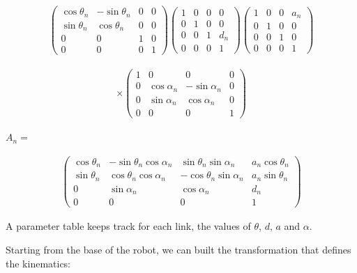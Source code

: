 \[\begin{aligned}
\begin{pmatrix}\cos \theta_{n} & -\sin \theta_{n} & 0 & 0 \\
         \sin \theta_{n} & \cos \theta_{n} & 0 & 0\\ 0 &0 & 1 & 0 \\
         0& 0& 0& 1 \end{pmatrix}
         \begin{pmatrix}1 & 0 & 0 & 0 \\ 0 & 1 & 0 & 0  \\
         0& 0 & 1 & d_{n} \\
         0& 0& 0& 1 \end{pmatrix}
         \begin{pmatrix}1 & 0 & 0 & a_{n} \\ 0 & 1 & 0 & 0  \\
         0& 0 & 1 & 0 \\
         0& 0& 0& 1 \end{pmatrix}
\end{aligned}\]

\[\begin{aligned}
\times
 \begin{pmatrix}1 & 0 & 0 & 0 \\ 0 & \cos \alpha_{n} & -\sin \alpha_{n} & 0  \\
         0& \sin \alpha_{n} & \cos \alpha_{n} & 0 \\
         0& 0& 0& 1 \end{pmatrix}
\end{aligned}\]

\(A_{n} =\)

\[\begin{aligned}
\begin{pmatrix}\cos \theta_{n} & -\sin \theta_{n}\cos \alpha_{n} & \sin \theta_{n}\sin \alpha_{n} & a_{n}\cos \theta_{n} \\
\sin \theta_{n} & \cos \theta_{n}\cos \alpha_{n} & -\cos \theta_{n}\sin \alpha_{n}  & a_{n}\sin \theta_{n} \\ 0 & \sin \alpha_{n}& \cos \alpha_{n} & d_{n} \\
0& 0& 0& 1 \end{pmatrix}
\end{aligned}\]

A parameter table keeps track for each link, the values of \(\theta\),
\(d\), \(a\) and \(\alpha\).

Starting from the base of the robot, we can built the transformation
that defines the kinematics:

